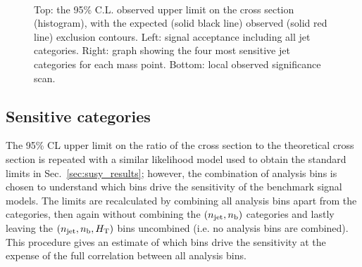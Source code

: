 \begin{figure}[h!]
\begin{center}
{            \label{fig:T2cc_signif}
        } ~~
        \caption{Top: the 95\% C.L. observed upper limit on the cross section
            (histogram), with the expected (solid black line) observed
            (solid red line) exclusion contours. Left: signal acceptance
            including all jet categories. Right: graph showing the four
            most sensitive jet categories for each mass point. Bottom:
            local observed significance scan.
        }
        \label{fig:T2cc}
    \end{center}
\end{figure}



\subsection{Sensitive categories}

The 95\% CL upper limit on the ratio of the cross section to the theoretical
cross section is repeated with a similar likelihood model used to obtain the
standard limits in Sec.~\ref{sec:susy_results}; however, the combination of
analysis bins is chosen to understand which bins drive the sensitivity of the
benchmark signal models. The limits are recalculated by combining all analysis
bins apart from the \nj categories, then again without combining the
$(n_{\text{jet}}, n_{\text{b}})$ categories and lastly leaving the $(n_{\text{jet}}, n_{\text{b}}, \mbox{$H_\text{T}$})$ bins
uncombined (i.e. no analysis bins are combined). This procedure gives an
estimate of which bins drive the sensitivity at the expense of the full
correlation between all analysis bins.

